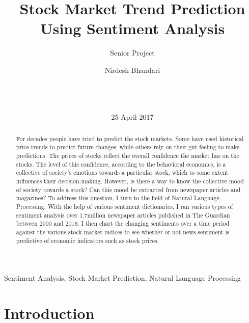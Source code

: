 \documentclass{acm_proc_article-sp}
\begin{document}
\title{ {\ttlit} Stock Market Trend Prediction Using Sentiment Analysis }
\subtitle{Senior Project}

\author{
\alignauthor
Nirdesh Bhandari\\
       \\
       \\
       \\
}


\date{25 April 2017}


\maketitle
\begin{abstract}
For decades people have tried to predict the stock markets. Some have used historical price trends to predict future changes, while others rely on their gut feeling to make predictions. The prices of stocks reflect the overall confidence the market has on the stocks. The level of this confidence, according to the behavioral economics, is a collective of society's emotions towards a particular stock, which to some extent influences their decision-making. However, is there a way to know the collective mood of society towards a stock? Can this mood be extracted from newspaper articles and magazines?  To address this question, I turn to the field of Natural Language Processing. With the help of various sentiment dictionaries, I ran various types of sentiment analysis over 1.7million newspaper articles published in The Guardian between 2000 and 2016. I then chart the changing sentiments over a time period against the various stock market indices to see whether or not news sentiment is predictive of economic indicators such as stock prices. 
\end{abstract}


\maketitle
\begin{keywords}
Sentiment Analysis, Stock Market Prediction, Natural Language Processing
\end{keywords}




\section{Introduction}
\end{document}
